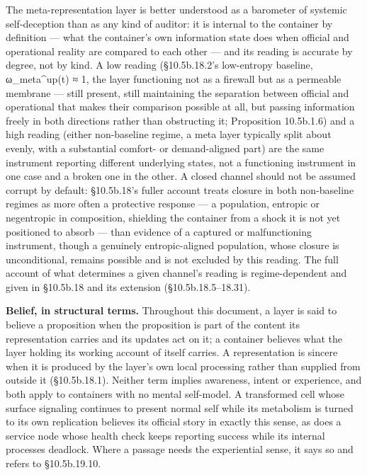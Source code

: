 \documentclass[
]{article}
\begin{document}
The meta-representation layer is better understood as a barometer of
systemic self-deception than as any kind of auditor: it is internal to
the container by definition --- what the container's own information
state does when official and operational reality are compared to each
other --- and its reading is accurate by degree, not by kind. A low
reading (§10.5b.18.2's low-entropy baseline, ω\_meta\^{}up(t) ≈ 1, the
layer functioning not as a firewall but as a permeable membrane ---
still present, still maintaining the separation between official and
operational that makes their comparison possible at all, but passing
information freely in both directions rather than obstructing it;
Proposition 10.5b.1.6) and a high reading (either non-baseline regime, a
meta layer typically split about evenly, with a substantial comfort- or
demand-aligned part) are the same instrument reporting different
underlying states, not a functioning instrument in one case and a broken
one in the other. A closed channel should not be assumed corrupt by
default: §10.5b.18's fuller account treats closure in both non-baseline
regimes as more often a protective response --- a population, entropic
or negentropic in composition, shielding the container from a shock it
is not yet positioned to absorb --- than evidence of a captured or
malfunctioning instrument, though a genuinely entropic-aligned
population, whose closure is unconditional, remains possible and is not
excluded by this reading. The full account of what determines a given
channel's reading is regime-dependent and given in §10.5b.18 and its
extension (§10.5b.18.5--18.31).

\textbf{Belief, in structural terms.} Throughout this document, a layer
is said to believe a proposition when the proposition is part of the
content its representation carries and its updates act on it; a
container believes what the layer holding its working account of itself
carries. A representation is sincere when it is produced by the layer's
own local processing rather than supplied from outside it (§10.5b.18.1).
Neither term implies awareness, intent or experience, and both apply to
containers with no mental self-model. A transformed cell whose surface
signaling continues to present normal self while its metabolism is
turned to its own replication believes its official story in exactly
this sense, as does a service node whose health check keeps reporting
success while its internal processes deadlock. Where a passage needs the
experiential sense, it says so and refers to §10.5b.19.10.
\end{document}
